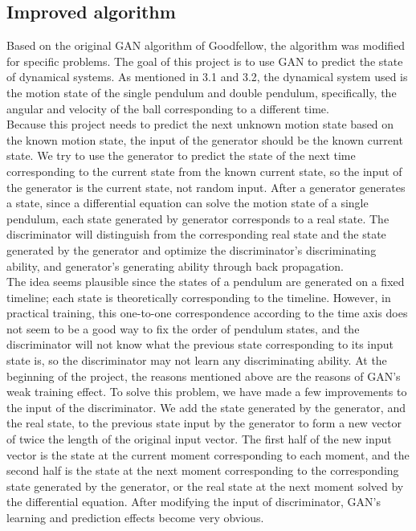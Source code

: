 \documentclass[11pt,a4paper]{article}
\begin{document}
\subsection{Improved algorithm}
Based on the original GAN algorithm of Goodfellow, the algorithm was modified for specific problems. The goal of this project is to use GAN to predict the state of dynamical systems. As mentioned in 3.1 and 3.2, the dynamical system used is the motion state of the single pendulum and double pendulum, specifically, the angular and velocity of the ball corresponding to a different time.
\\
\newline
Because this project needs to predict the next unknown motion state based on the known motion state, the input of the generator should be the known current state. We try to use the generator to predict the state of the next time corresponding to the current state from the known current state, so the input of the generator is the current state, not random input. After a generator generates a state, since a differential equation can solve the motion state of a single pendulum, each state generated by generator corresponds to a real state. The discriminator will distinguish from the corresponding real state and the state generated by the generator and optimize the discriminator's discriminating ability, and generator's generating ability through back propagation.
\\
\newline
The idea seems plausible since the states of a pendulum are generated on a fixed timeline; each state is theoretically corresponding to the timeline. However, in practical training, this one-to-one correspondence according to the time axis does not seem to be a good way to fix the order of pendulum states, and the discriminator will not know what the previous state corresponding to its input state is, so the discriminator may not learn any discriminating ability. At the beginning of the project, the reasons mentioned above are the reasons of GAN's weak training effect.
To solve this problem, we have made a few improvements to the input of the discriminator. We add the state generated by the generator, and the real state, to the previous state input by the generator to form a new vector of twice the length of the original input vector. The first half of the new input vector is the state at the current moment corresponding to each moment, and the second half is the state at the next moment corresponding to the corresponding state generated by the generator, or the real state at the next moment solved by the differential equation. After modifying the input of discriminator, GAN's learning and prediction effects become very obvious.
\end{document}
